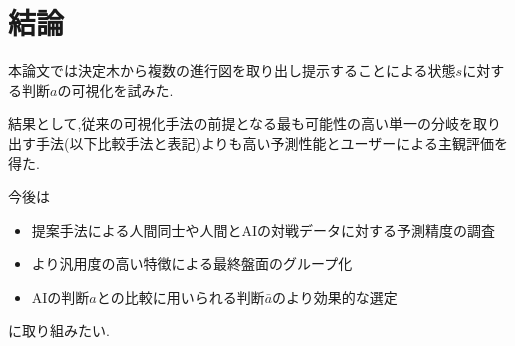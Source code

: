 \chapter{結論}
本論文では決定木から複数の進行図を取り出し提示することによる状態$s$に対する判断$a$の可視化を試みた.

結果として,従来の可視化手法の前提となる最も可能性の高い単一の分岐を取り出す手法(以下比較手法と表記)よりも高い予測性能とユーザーによる主観評価を得た.

今後は
\begin{itemize}
	\item 提案手法による人間同士や人間とAIの対戦データに対する予測精度の調査
	\item より汎用度の高い特徴による最終盤面のグループ化
	\item AIの判断$a$との比較に用いられる判断$\bar{a}$のより効果的な選定
\end{itemize}


に取り組みたい.
